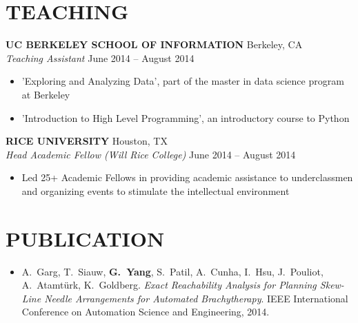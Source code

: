 \documentclass[margin]{res}
\begin{document}
\begin{resume}
\section{TEACHING}
{\bf UC BERKELEY SCHOOL OF INFORMATION} Berkeley, CA \\
{\em Teaching Assistant} \hfill
June 2014 -- August 2014 \\                                          \vspace{-4mm}
\begin{itemize}                                         \itemsep1pt %
        \item   'Exploring and Analyzing Data', part of the master in data science program at Berkeley
        \item   'Introduction to High Level Programming', an introductory course to Python
\end{itemize}
{\bf RICE UNIVERSITY} Houston, TX \\
{\em Head Academic Fellow (Will Rice College)} \hfill
June 2014 -- August 2014 \\                                          \vspace{-4mm}
\begin{itemize}                                         \itemsep1pt %
        \item   Led 25+ Academic Fellows in providing academic assistance to underclassmen and organizing events to stimulate the intellectual environment
\end{itemize}
\section{PUBLICATION}
\begin{itemize}                                                 \itemsep1pt
        \item   A.\ Garg, T.\ Siauw, \textbf{G.\ Yang}, S.\ Patil, A.\ Cunha, I.\ Hsu, J.\ Pouliot, A.\ Atamt\"urk, K.\ Goldberg. \textit{Exact Reachability Analysis for Planning Skew-Line Needle Arrangements for Automated Brachytherapy}. IEEE International Conference on Automation Science and Engineering, 2014. 
\end{itemize}
\vspace{-2mm}



\end{resume}
\end{document}
